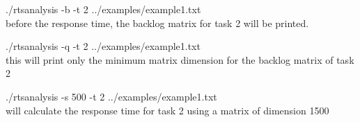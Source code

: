 \documentclass[a4paper]{article}
\begin{document}
./rtsanalysis -b -t 2  ../examples/example1.txt \\
before the response time, the backlog matrix for task 2 will be printed.

./rtsanalysis -q -t 2  ../examples/example1.txt \\
this will print only the minimum matrix dimension for the backlog matrix of task 2

./rtsanalysis  -s 500 -t 2  ../examples/example1.txt \\
will calculate the response time for task 2 using a matrix of dimension 1500
\end{document}

